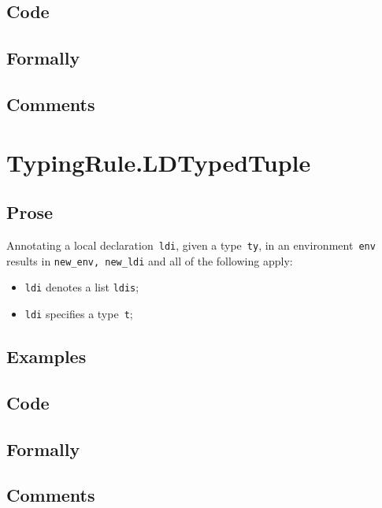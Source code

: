 \documentclass{book}
\begin{document}
  \subsection{Code}

  \subsection{Formally}

  \subsection{Comments}

\section{TypingRule.LDTypedTuple \label{sec:TypingRule.LDTypedTuple}}

  \subsection{Prose}
    Annotating a local declaration~\texttt{ldi}, given a type~\texttt{ty}, in
an environment~\texttt{env} results in \texttt{new\_env, new\_ldi} and all of
the following apply:
  \begin{itemize}
  \item \texttt{ldi} denotes a list \texttt{ldis};
  \item \texttt{ldi} specifies a type~\texttt{t};
  \end{itemize}
  
  \subsection{Examples}

  \subsection{Code}

  \subsection{Formally}

  \subsection{Comments}
\end{document}
